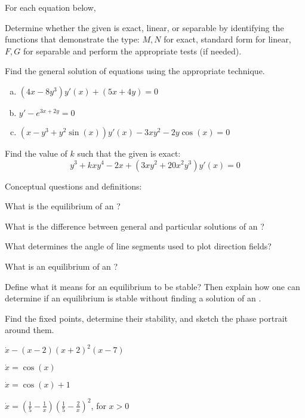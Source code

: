 \begin{question}
  For each equation below,
  \begin{compactitem}
    \item Determine whether the given \ode{} is exact, linear, or separable by identifying the functions that demonstrate the type: \(M,N\) for exact, standard form for linear, \(F,G\) for separable and perform the appropriate tests (if needed).
    \item Find the general solution of equations using the appropriate technique.
  \end{compactitem}
  \begin{enumerate}[(a)]
    \item \((4x-8y^3)y'(x) + (5x+4y) = 0\)
    \item \(y' - e^{3x + 2y} = 0\)
    \item \((x-y^3+y^2\sin(x))y'(x) - 3xy^2-2y\cos(x) = 0\)
  \end{enumerate}
\end{question}

\begin{question}
  Find the value of $k$ such that the given \ode{} is exact:\\
    \[
    y^3 + kxy^4-2x + (3xy^2+20x^2y^3)y'(x)=0
    \]
\end{question}


\begin{question}
Conceptual questions and definitions:
  \begin{compactenum}[(a)]
    \item What is the equilibrium of an \ode{}?
    \item What is the difference between general and particular solutions of an \ode{}?
    \item What determines the angle of line segments used to plot direction fields?
    \item What is an equilibrium of an \ode{}?
    \item Define what it means for an equilibrium to be stable? Then explain how one can determine if an equilibrium is stable without finding a solution of an \ode{}.
  \end{compactenum}
\end{question}


\begin{question}
  Find the fixed points, determine their stability, and sketch the phase portrait around them.
  \begin{colenumerate}
    \item \(\dot x - (x-2)(x+2)^{2}(x-7)\)
    \item \(\dot x = \cos(x) \)
    \item \(\dot x = \cos(x) + 1\)
    \item \(\dot x = \left( \frac{1}{5} - \frac{1}{x} \right)\left( \frac{1}{5} - \frac{2}{x} \right)^{2} \), for \(x > 0\)
  \end{colenumerate}
\end{question}


